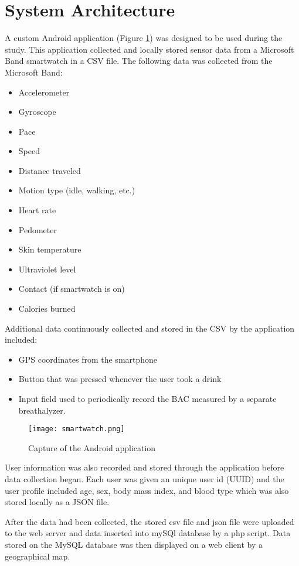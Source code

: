 \section{System Architecture}
A custom Android application (Figure \ref{app}) was designed to be used during the study. This application collected and locally stored sensor data from a Microsoft Band smartwatch in a CSV file. The following data was collected from the Microsoft Band:
\begin{itemize}
	\item Accelerometer
	\item Gyroscope
	\item Pace
	\item Speed
	\item Distance traveled
	\item Motion type (idle, walking, etc.)
	\item Heart rate
	\item Pedometer
	\item Skin temperature
	\item Ultraviolet level
	\item Contact (if smartwatch is on)
	\item Calories burned
\end{itemize}
Additional data continuously collected and stored in the CSV by the application included:
\begin{itemize}
	\item GPS coordinates from the smartphone 
	\item Button that was pressed whenever the user took a drink
	\item Input field used to periodically record the BAC measured by a separate breathalyzer.
\end{itemize} 

\begin{figure}[H]
	\centering
	\texttt{[image: smartwatch.png]}
	\caption{Capture of the Android application}
	\label{app}
\end{figure}

User information was also recorded and stored through the application before data collection began. Each user was given an unique user id (UUID) and the user profile included age, sex, body mass index, and blood type which was also stored locally as a JSON file.

After the data had been collected, the stored csv file and json file were uploaded to the web server and data inserted into mySQl database by a php script. Data stored on the MySQL database was then displayed on a web client by a geographical map. 


